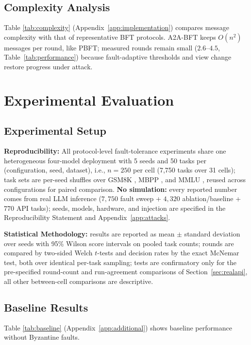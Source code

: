 \documentclass{article}
\begin{document}
\subsection{Complexity Analysis}
Table \ref{tab:complexity} (Appendix~\ref{app:implementation}) compares message complexity with that of representative BFT protocols. A2A-BFT keeps $O(n^2)$ messages per round, like PBFT; measured rounds remain small ($2.6$--$4.5$, Table~\ref{tab:performance}) because fault-adaptive thresholds and view change restore progress under attack.

\section{Experimental Evaluation}
\label{sec:experiments}

\subsection{Experimental Setup}\label{sec:setup}

\textbf{Reproducibility:} All protocol-level fault-tolerance experiments share one heterogeneous four-model deployment with 5 seeds and 50 tasks per (configuration, seed, dataset), i.e., $n{=}250$ per cell (7{,}750 tasks over 31 cells); task sets are per-seed shuffles over GSM8K \citep{gsm8k}, MBPP \citep{mbpp}, and MMLU \citep{mmlu}, reused across configurations for paired comparison. \textbf{No simulation:} every reported number comes from real LLM inference ($7{,}750$ fault sweep + $4{,}320$ ablation/baseline + $770$ API tasks); seeds, models, hardware, and injection are specified in the Reproducibility Statement and Appendix~\ref{app:attacks}.

\textbf{Statistical Methodology:} results are reported as mean $\pm$ standard deviation over seeds with 95\% Wilson score intervals on pooled task counts; rounds are compared by two-sided Welch $t$-tests and decision rates by the exact McNemar test, both over identical per-task sampling; tests are confirmatory only for the pre-specified round-count and run-agreement comparisons of Section~\ref{sec:realapi}, all other between-cell comparisons are descriptive.

\subsection{Baseline Results}

Table \ref{tab:baseline} (Appendix~\ref{app:additional}) shows baseline performance without Byzantine faults.
\end{document}
